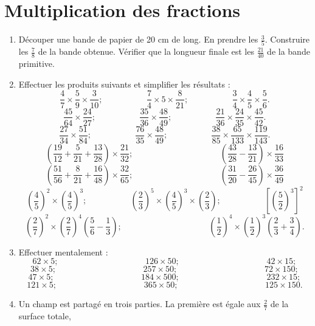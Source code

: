 \documentclass[12 pt]{report}
\theoremstyle{plain}
\newcounter{n}
\begin{document}
 \chapter{Multiplication des fractions}
 
 \begin{enumerate}
 \item Découper une bande de papier de 20 cm de long. 
 En prendre les $\frac35$. Construire les $\frac78$ de la bande obtenue. Vérifier que la longueur finale est les $\frac{21}{40}$ de la bande primitive. 
 \item Effectuer les produits suivants et simplifier les résultats : 
 \[ \frac47\times \frac59\times \frac3{10}; 
 \phantom{meowmeow} \frac74\times5\times\frac8{21};
  \phantom{meowmeow}  \frac34\times \frac45\times \frac56.\] 
   \[ \frac{45}{64}\times\frac{24}{27}; 
 \phantom{meowmeow} \frac{35}{36}\times\frac{48}{49};
  \phantom{meowmeow}  \frac{21}{36}\times\frac{24}{35} \times \frac{45}{42}.\] 
   \[ \frac{27}{34}\times \frac{51}{84}; 
 \phantom{meowmeow} \frac{76}{35}\times\frac{48}{49};
  \phantom{meowmeow}  \frac{38}{85}\times \frac{65}{133} \times \frac{119}{143}.\] 
  \[ \left(\frac{19}{12} + \frac5{21} + \frac{13}{28}
   \right)\times\frac{21}{32}; \phantom{meowmeowmeowmeow}
   \left(\frac{43}{28}-\frac{13}{21}\right)\times 
   \frac{16}{33} \]
     \[ \left(\frac{51}{56} + \frac8{21} + \frac{16}{48}
   \right)\times\frac{32}{65}; \phantom{meowmeowmeowmeow}
   \left(\frac{31}{20}-\frac{26}{45}\right)\times 
   \frac{36}{49} \]
   \[ \left( \frac45\right)^2 \times \left(\frac45\right)^3; \phantom{meowmeow} 
   \left( \frac23\right)^5 \times \left(\frac45\right)^3\times \left(\frac23\right);
   \phantom{meowmeow} \left[\left(\frac52\right)^3\right]^2\]
   \[ \left(\frac27\right)^2 \times \left(\frac27\right)^4\left(\frac56-\frac13\right) ; 
    \phantom{meowmeowmeowmeow}
    \left(\frac12\right)^4 \times \left(\frac12\right)^3 \left(\frac23+\frac34\right).\]
 \item Effectuer mentalement : 
 \[ 62 \times 5;  \phantom{meowmeowmeowmeow}
 126 \times 50;  \phantom{meowmeowmeowmeow}
 42 \times 15;\]
  \[ 38 \times 5;  \phantom{meowmeowmeowmeow}
 257 \times 50;  \phantom{meowmeowmeowmeow}
 72 \times 150;\] \[ 47 \times 5;  \phantom{meowmeowmeowmeow}
 184 \times 500;  \phantom{meowmeowmeowmeow}
 232 \times 15;\] 
 \[ 121 \times 5;  \phantom{meowmeowmeowmeow}
 365 \times 50;  \phantom{meowmeowmeowmeow}
 125 \times 150.\]
 \item Un champ est partagé en trois parties. La première est égale aux $\frac27$ de la surface totale,

\end{enumerate}
\end{document}
